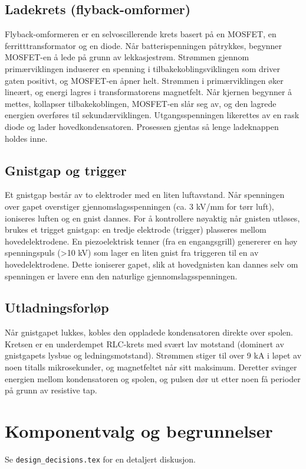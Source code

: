 \documentclass{article}
\begin{document}
\subsection{Ladekrets (flyback-omformer)}
Flyback-omformeren er en selvoscillerende krets basert på en MOSFET, en ferritttransformator og en diode. Når batterispenningen påtrykkes, begynner MOSFET-en å lede på grunn av lekkasjestrøm. Strømmen gjennom primærviklingen induserer en spenning i tilbakekoblingsviklingen som driver gaten positivt, og MOSFET-en åpner helt. Strømmen i primærviklingen øker lineært, og energi lagres i transformatorens magnetfelt. Når kjernen begynner å mettes, kollapser tilbakekoblingen, MOSFET-en slår seg av, og den lagrede energien overføres til sekundærviklingen. Utgangsspenningen likerettes av en rask diode og lader hovedkondensatoren. Prosessen gjentas så lenge ladeknappen holdes inne.

\subsection{Gnistgap og trigger}
Et gnistgap består av to elektroder med en liten luftavstand. Når spenningen over gapet overstiger gjennomslagsspenningen (ca. 3 kV/mm for tørr luft), ioniseres luften og en gnist dannes. For å kontrollere nøyaktig når gnisten utløses, brukes et trigget gnistgap: en tredje elektrode (trigger) plasseres mellom hovedelektrodene. En piezoelektrisk tenner (fra en engangsgrill) genererer en høy spenningspuls (>10 kV) som lager en liten gnist fra triggeren til en av hovedelektrodene. Dette ioniserer gapet, slik at hovedgnisten kan dannes selv om spenningen er lavere enn den naturlige gjennomslagsspenningen.

\subsection{Utladningsforløp}
Når gnistgapet lukkes, kobles den oppladede kondensatoren direkte over spolen. Kretsen er en underdempet RLC-krets med svært lav motstand (dominert av gnistgapets lysbue og ledningsmotstand). Strømmen stiger til over 9 kA i løpet av noen titalls mikrosekunder, og magnetfeltet når sitt maksimum. Deretter svinger energien mellom kondensatoren og spolen, og pulsen dør ut etter noen få perioder på grunn av resistive tap.

\section{Komponentvalg og begrunnelser}
Se \texttt{design\_decisions.tex} for en detaljert diskusjon.
\end{document}
